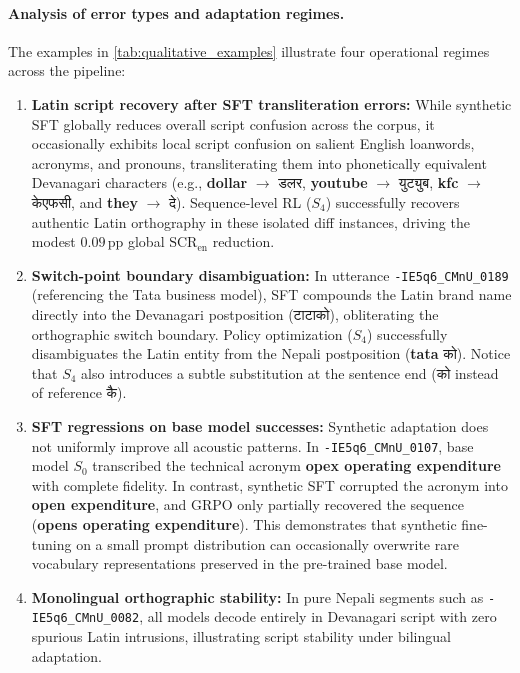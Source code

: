 \documentclass[10pt,twocolumn,a4paper]{article}
\newcommand{\dev}[1]{{\devfont #1}}
\newcommand{\sys}[1]{$S_{#1}$}
\newcommand{\pp}{\,\text{pp}}
\newcommand{\SCRen}{\text{SCR}_{\text{en}}}
\begin{document}
\paragraph{Analysis of error types and adaptation regimes.}
The examples in \cref{tab:qualitative_examples} illustrate four operational regimes across the pipeline:
\begin{enumerate}[nosep,leftmargin=1.2em,topsep=1pt]
  \item \textbf{Latin script recovery after SFT transliteration errors:} While synthetic SFT globally reduces overall script confusion across the corpus, it occasionally exhibits local script confusion on salient English loanwords, acronyms, and pronouns, transliterating them into phonetically equivalent Devanagari characters (e.g., \textbf{dollar} $\to$ \dev{डलर}, \textbf{youtube} $\to$ \dev{युट्युब}, \textbf{kfc} $\to$ \dev{केएफसी}, and \textbf{they} $\to$ \dev{दे}). Sequence-level RL (\sys{4}) successfully recovers authentic Latin orthography in these isolated diff instances, driving the modest $0.09\pp$ global $\SCRen$ reduction.
  \item \textbf{Switch-point boundary disambiguation:} In utterance \texttt{-IE5q6\_CMnU\_0189} (referencing the Tata business model), SFT compounds the Latin brand name directly into the Devanagari postposition (\dev{टाटाको}), obliterating the orthographic switch boundary. Policy optimization (\sys{4}) successfully disambiguates the Latin entity from the Nepali postposition (\textbf{tata} \dev{को}). Notice that \sys{4} also introduces a subtle substitution at the sentence end (\dev{को} instead of reference \dev{कै}).
  \item \textbf{SFT regressions on base model successes:} Synthetic adaptation does not uniformly improve all acoustic patterns. In \texttt{-IE5q6\_CMnU\_0107}, base model \sys{0} transcribed the technical acronym \textbf{opex operating expenditure} with complete fidelity. In contrast, synthetic SFT corrupted the acronym into \textbf{open expenditure}, and GRPO only partially recovered the sequence (\textbf{opens operating expenditure}). This demonstrates that synthetic fine-tuning on a small prompt distribution can occasionally overwrite rare vocabulary representations preserved in the pre-trained base model.
  \item \textbf{Monolingual orthographic stability:} In pure Nepali segments such as \texttt{-IE5q6\_CMnU\_0082}, all models decode entirely in Devanagari script with zero spurious Latin intrusions, illustrating script stability under bilingual adaptation.
\end{enumerate}
\end{document}
